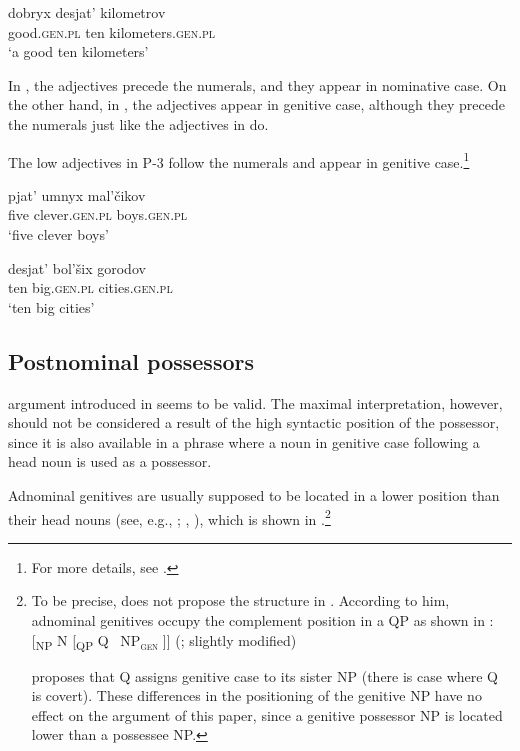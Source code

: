 \documentclass[output=paper,
colorlinks,
citecolor=brown,
newtxmath
]{langscibook}
\begin{document}
\ex\label{Iadj2}
\gll   dobryx desjat' kilometrov\\
good.\textsc{gen.pl} ten kilometers.\textsc{gen.pl}\\
\glt `a good ten kilometers' \hfill \citep[175]{Kagan.Pereltsvaig2012}
\z\z

\noindent In , the adjectives precede the numerals, and they appear in nominative case. On the other hand, in , the adjectives appear in genitive case, although they precede the numerals just like the adjectives in  do.

The low adjectives in \textalpha P-3 follow the numerals and appear in genitive case.\footnote{For more details, see \citet{Kagan.Pereltsvaig2012}.}

\ea
\ea\label{Ladj1}
\gll  pjat' umnyx mal'čikov\\
five clever.\textsc{gen.pl} boys.\textsc{gen.pl}\\
\glt `five clever boys'

\ex\label{Ladj2}
\gll desjat' bol'šix gorodov\\
ten big.\textsc{gen.pl} cities.\textsc{gen.pl}\\
\glt `ten big cities' \hfill \citep[169]{Kagan.Pereltsvaig2012}
\z\z

\subsection{Postnominal possessors}\label{ID}

 argument introduced in  seems to be valid. The maximal interpretation, however, should not be considered a result of the high syntactic position of the possessor, since it is also available in a phrase where a noun in genitive case following a head noun is used as a possessor.

Adnominal genitives are usually supposed to be located in a lower position than their head nouns (see, e.g., \citealt[38]{Franks1995}; \citealt[214]{Bailyn2012}, \citealt[84]{Mitrenina2012}), which is shown in .\footnote{To be precise, \citet{Bailyn2012} does not propose the structure in . According to him, adnominal genitives occupy the complement position in a QP as shown in :
    \ea\label{bailyn-i}
    [\textsubscript{NP} N [\textsubscript{QP} Q \, NP\textsubscript{\textsc{gen}} ]]
	\hfill (\citealt[214]{Bailyn2012}; slightly modified)
    \z

    \noindent \citet[214]{Bailyn2012} proposes that Q assigns genitive case to its sister NP (there is case where Q is covert). These differences in the positioning of the genitive NP have no effect on the argument of this paper, since a genitive possessor NP is located lower than a possessee NP.}
\end{document}

